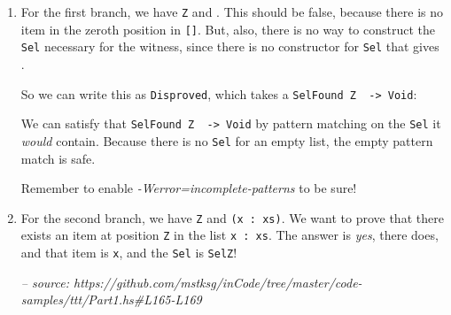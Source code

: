 \documentclass[]{article}
\newenvironment{Shaded}{}{}
\newcommand{\CommentTok}[1]{\textcolor[rgb]{0.38,0.63,0.69}{\textit{#1}}}
\newcommand{\DataTypeTok}[1]{\textcolor[rgb]{0.56,0.13,0.00}{#1}}
\newcommand{\FunctionTok}[1]{\textcolor[rgb]{0.02,0.16,0.49}{#1}}
\newcommand{\KeywordTok}[1]{\textcolor[rgb]{0.00,0.44,0.13}{\textbf{#1}}}
\newcommand{\NormalTok}[1]{#1}
\newcommand{\OtherTok}[1]{\textcolor[rgb]{0.00,0.44,0.13}{#1}}
\begin{document}
\begin{enumerate}
\def\labelenumi{\arabic{enumi}.}
\item
  For the first branch, we have \texttt{\textquotesingle{}Z} and
  \texttt{\textquotesingle{}{[}{]}}. This should be false, because there is no
  item in the zeroth position in \texttt{{[}{]}}. But, also, there is no way to
  construct the \texttt{Sel} necessary for the witness, since there is no
  constructor for \texttt{Sel} that gives \texttt{\textquotesingle{}{[}{]}}.

  So we can write this as \texttt{Disproved}, which takes a
  \texttt{SelFound\ \textquotesingle{}Z\ \textquotesingle{}{[}{]}\ -\textgreater{}\ Void}:

\begin{Shaded}
\end{Shaded}

  We can satisfy that
  \texttt{SelFound\ \textquotesingle{}Z\ \textquotesingle{}{[}{]}\ -\textgreater{}\ Void}
  by pattern matching on the \texttt{Sel} it \emph{would} contain. Because there
  is no \texttt{Sel} for an empty list, the empty pattern match is safe.

  Remember to enable \emph{-Werror=incomplete-patterns} to be sure!
\item
  For the second branch, we have \texttt{\textquotesingle{}Z} and
  \texttt{(x\ \textquotesingle{}:\ xs)}. We want to prove that there exists an
  item at position \texttt{\textquotesingle{}Z} in the list
  \texttt{x\ \textquotesingle{}:\ xs}. The answer is \emph{yes}, there does, and
  that item is \texttt{x}, and the \texttt{Sel} is \texttt{SelZ}!

\begin{Shaded}
\begin{Highlighting}[]
\CommentTok{-- source: https://github.com/mstksg/inCode/tree/master/code-samples/ttt/Part1.hs#L165-L169}


\end{Highlighting}
\end{Shaded}
\end{enumerate}
\end{document}
